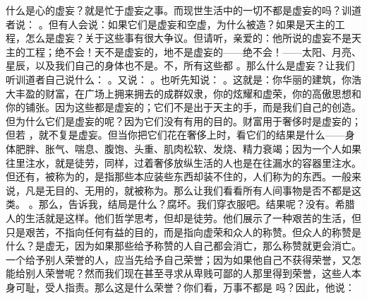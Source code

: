 什么是心的虚妄？就是忙于虚妄之事。而现世生活中的一切不都是虚妄的吗？训道者说： 。但有人会说：如果它们是虚妄和空虚，为什么被造？如果是天主的工程，怎么是虚妄？关于这些事有很大争议。但请听，亲爱的：他所说的虚妄不是天主的工程；绝不会！天不是虚妄的，地不是虚妄的——绝不会！——太阳、月亮、星辰，以及我们自己的身体也不是。不，所有这些都 。那么什么是虚妄？让我们听训道者自己说什么： 。又说： 。也听先知说： 。这就是：你华丽的建筑，你浩大丰盈的财富，在广场上拥来拥去的成群奴隶，你的炫耀和虚荣，你的高傲思想和你的铺张。因为这些都是虚妄的；它们不是出于天主的手，而是我们自己的创造。但为什么它们是虚妄的呢？因为它们没有有用的目的。财富用于奢侈时是虚妄的；但若 ，就不复是虚妄。但当你把它们花在奢侈上时，看它们的结果是什么——身体肥胖、胀气、喘息、腹饱、头重、肌肉松软、发烧、精力衰竭；因为一个人如果往里注水，就是徒劳，同样，过着奢侈放纵生活的人也是在往漏水的容器里注水。但还有，被称为的，是指那些本应装些东西却装不住的，人们称为的东西。一般来说，凡是无目的、无用的，就被称为。那么让我们看看所有人间事物是否不都是这类。 。那么，告诉我，结局是什么？腐坏。我们穿衣服吧。结果呢？没有。希腊人的生活就是这样。他们哲学思考，但却是徒劳。他们展示了一种艰苦的生活，但只是艰苦，不指向任何有益的目的，而是指向虚荣和众人的称赞。但众人的称赞是什么？是虚无，因为如果那些给予称赞的人自己都会消亡，那么称赞就更会消亡。一个给予别人荣誉的人，应当先给予自己荣誉；因为如果他自己不获得荣誉，又怎能给别人荣誉呢？然而我们现在甚至寻求从卑贱可鄙的人那里得到荣誉，这些人本身可耻，受人指责。那么这是什么荣誉？你们看，万事不都是 吗？因此，他说：\par

